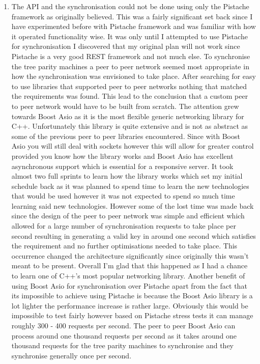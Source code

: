 \begin{enumerate}
\item The API and the synchronisation could not be done using only the Pistache framework as originally believed. This was a fairly significant set back since I have experimented before with Pistache framework and was familiar with how it operated functionality wise. It was only until I attempted to use Pistache for synchronisation I discovered that my original plan will not work since Pistache is a very good REST framework and not much else. To synchronise the tree parity machines a peer to peer network seemed most appropriate in how the synchronisation was envisioned to take place. After searching for easy to use libraries that supported peer to peer networks nothing that matched the requirements was found. This lead to the conclusion that a custom peer to peer network would have to be built from scratch. The attention grew towards Boost Asio as it is the most flexible generic networking library for C++. Unfortunately this library is quite extensive and is not as abstract as some of the previous peer to peer libraries encountered. Since with Boost Asio you will still deal with sockets however this will allow for greater control provided you know how the library works and Boost Asio has excellent asynchronous support which is essential for a responsive server. It took almost two full sprints to learn how the library works which set my initial schedule back as it was planned to spend time to learn the new technologies that would be used however it was not expected to spend so much time learning said new technologies. However some of the lost time was made back since the design of the peer to peer network was simple and efficient which allowed for a large number of synchronisation requests to take place per second resulting in generating a valid key in around one second which satisfies the requirement and no further optimisations needed to take place. This occurrence changed the architecture significantly since originally this wasn't meant to be present. Overall I'm glad that this happened as I had a chance to learn one of C++'s most popular networking library. Another benefit of using Boost Asio for synchronisation over Pistache apart from the fact that its impossible to achieve using Pistache is because the Boost Asio library is a lot lighter the performance increase is rather large. Obviously this would be impossible to test fairly however based on Pistache stress tests it can manage roughly 300 - 400 requests per second. The peer to peer Boost Asio can process around one thousand requests per second as it takes around one thousand requests for the tree parity machines to synchronise and they synchronise generally once per second.

\end{enumerate}

